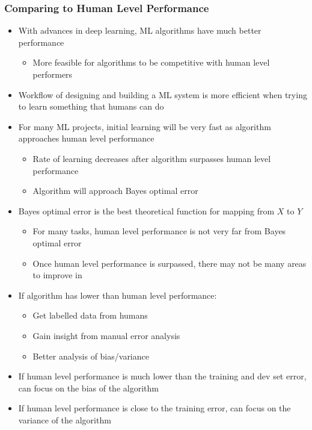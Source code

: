 \documentclass[12pt, letterpaper]{article}
\begin{document}
    \subsubsection{Comparing to Human Level Performance}
    \begin{itemize}
        \item With advances in deep learning, ML algorithms have much better performance
        \begin{itemize}
            \item More feasible for algorithms to be competitive with human level performers
        \end{itemize}
        \item Workflow of designing and building a ML system is more efficient when trying to learn something that humans can do
        \item For many ML projects, initial learning will be very fast as algorithm approaches human level performance
        \begin{itemize}
            \item Rate of learning decreases after algorithm surpasses human level performance
            \item Algorithm will approach Bayes optimal error
        \end{itemize} 
        \item Bayes optimal error is the best theoretical function for mapping from $X$ to $Y$
        \begin{itemize}
            \item For many tasks, human level performance is not very far from Bayes optimal error
            \item Once human level performance is surpassed, there may not be many areas to improve in
        \end{itemize}
        \item If algorithm has lower than human level performance:
        \begin{itemize}
            \item Get labelled data from humans
            \item Gain insight from manual error analysis 
            \item Better analysis of bias/variance
        \end{itemize}
        \item If human level performance is much lower than the training and dev set error, can focus on the bias of the algorithm  
        \item If human level performance is close to the training error, can focus on the variance of the algorithm

\end{itemize}
\end{document}

